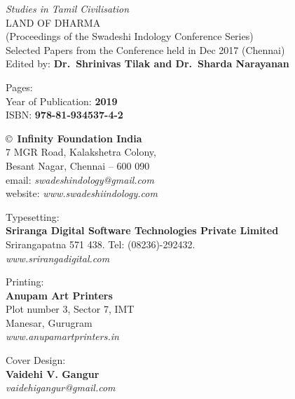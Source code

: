 \thispagestyle{empty}

\noindent
{\fontsize{9}{11}\selectfont\sl Studies in Tamil Civilisation}\\
LAND OF DHARMA\\
(Proceedings of the Swadeshi Indology Conference Series)\\
Selected Papers from the Conference held in Dec 2017 (Chennai)\\
Edited by: {\bf Dr.\ Shrinivas Tilak and Dr.\ Sharda Narayanan}
\vfill

\noindent
Pages: {\bf\pageref{bookend}}\\
Year of Publication: {\bf 2019}\\
ISBN: {\bf 978-81-934537-4-2}\\
\vfill

\noindent
\copyright\ {\bf Infinity Foundation India}\\ 
7 MGR Road, Kalakshetra Colony,\\ 
Besant Nagar, Chennai -- 600 090\\
email: {\sl swadeshindology@gmail.com}\\
website: {\sl www.swadeshiindology.com} 
\vfill

\noindent
Typesetting:\\ 
{\bf Sriranga Digital Software Technologies Private Limited}\\ 
Srirangapatna 571 438. Tel: (08236)-292432.\\
{\sl www.srirangadigital.com}
\vfill

\noindent
Printing:\\
{\bf Anupam Art Printers}\\
Plot number 3, Sector 7, IMT\\
Manesar, Gurugram\\
{\sl www.anupamartprinters.in}
\bigskip

\noindent
Cover Design:\\ 
{\bf Vaidehi V. Gangur}\\
{\sl vaidehigangur@gmail.com}
